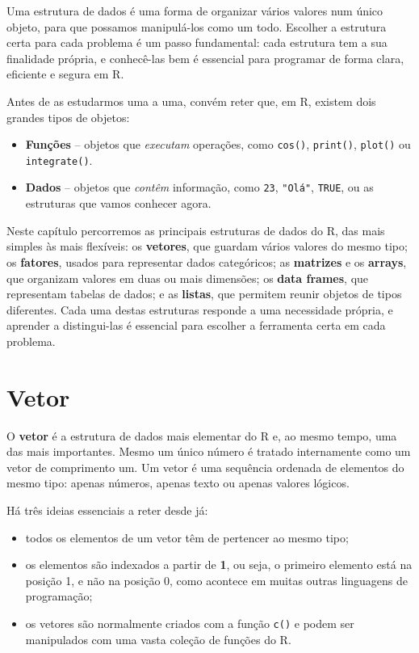 \documentclass[
  portuguese,
  11pt,
  openany]{book}
\providecommand{\tightlist}{%
  \setlength{\itemsep}{0pt}\setlength{\parskip}{0pt}}
\begin{document}
Uma estrutura de dados é uma forma de organizar vários valores num único objeto, para que possamos manipulá-los como um todo. Escolher a estrutura certa para cada problema é um passo fundamental: cada estrutura tem a sua finalidade própria, e conhecê-las bem é essencial para programar de forma clara, eficiente e segura em R.

Antes de as estudarmos uma a uma, convém reter que, em R, existem dois grandes tipos de objetos:

\begin{itemize}
\tightlist
\item
  \textbf{Funções} -- objetos que \emph{executam} operações, como \texttt{cos()}, \texttt{print()},
  \texttt{plot()} ou \texttt{integrate()}.
\item
  \textbf{Dados} -- objetos que \emph{contêm} informação, como \texttt{23}, \texttt{"Olá"}, \texttt{TRUE}, ou as
  estruturas que vamos conhecer agora.
\end{itemize}

Neste capítulo percorremos as principais estruturas de dados do R, das mais simples às mais flexíveis: os \textbf{vetores}, que guardam vários valores do mesmo tipo; os \textbf{fatores}, usados para representar dados categóricos; as \textbf{matrizes} e os \textbf{arrays}, que organizam valores em duas ou mais dimensões; os \textbf{data frames}, que representam tabelas de dados; e as \textbf{listas}, que permitem reunir objetos de tipos diferentes. Cada uma destas estruturas responde a uma necessidade própria, e aprender a distingui-las é essencial para escolher a ferramenta certa em cada problema.

\section{Vetor}\label{vetor}

O \textbf{vetor} é a estrutura de dados mais elementar do R e, ao mesmo tempo, uma das mais importantes. Mesmo um único número é tratado internamente como um vetor de comprimento um. Um vetor é uma sequência ordenada de elementos do mesmo tipo: apenas números, apenas texto ou apenas valores lógicos.

Há três ideias essenciais a reter desde já:

\begin{itemize}
\tightlist
\item
  todos os elementos de um vetor têm de pertencer ao mesmo tipo;
\item
  os elementos são indexados a partir de \textbf{1}, ou seja, o primeiro elemento está na posição 1, e não na posição 0, como acontece em muitas outras linguagens de programação;
\item
  os vetores são normalmente criados com a função \texttt{c()} e podem ser manipulados com uma vasta coleção de funções do R.
\end{itemize}
\end{document}
